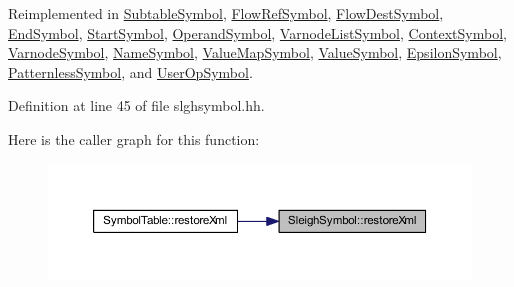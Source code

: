 Reimplemented in \mbox{\hyperlink{class_subtable_symbol_ac7ee481c0b61d730dab915a4f80e8061}{Subtable\+Symbol}}, \mbox{\hyperlink{class_flow_ref_symbol_a64565b89e176acc3743f31133548310d}{Flow\+Ref\+Symbol}}, \mbox{\hyperlink{class_flow_dest_symbol_a1ba9aafc51b34b72972f50748de739cc}{Flow\+Dest\+Symbol}}, \mbox{\hyperlink{class_end_symbol_a4b319014daff5bfe82e79d3b7e7b6402}{End\+Symbol}}, \mbox{\hyperlink{class_start_symbol_a8bffa932c38139afeacdafdbb8611c2f}{Start\+Symbol}}, \mbox{\hyperlink{class_operand_symbol_a89eb88d3d81b27fae7432adf31d2d27a}{Operand\+Symbol}}, \mbox{\hyperlink{class_varnode_list_symbol_a61923762838951414bd2c84454652d44}{Varnode\+List\+Symbol}}, \mbox{\hyperlink{class_context_symbol_a3ea7d156033d1dc82c9c3452496641a9}{Context\+Symbol}}, \mbox{\hyperlink{class_varnode_symbol_a9d0f7e98d0425e26ca4eddf002f1e471}{Varnode\+Symbol}}, \mbox{\hyperlink{class_name_symbol_a3ff5b56a8a5cfd2e009cc5c9e8a49e97}{Name\+Symbol}}, \mbox{\hyperlink{class_value_map_symbol_a713f4ece8b103374e08d4b53f9ef174b}{Value\+Map\+Symbol}}, \mbox{\hyperlink{class_value_symbol_af9104983ea7381b608fe56b5ab8a2d7c}{Value\+Symbol}}, \mbox{\hyperlink{class_epsilon_symbol_a0ce24cb1b91e38a1c45b5ec9d6af553a}{Epsilon\+Symbol}}, \mbox{\hyperlink{class_patternless_symbol_ab81f5522c0e65c2fe464d4bb62193948}{Patternless\+Symbol}}, and \mbox{\hyperlink{class_user_op_symbol_a96b0bf7c65b30f21307b156bf13bc1a7}{User\+Op\+Symbol}}.



Definition at line 45 of file slghsymbol.\+hh.

Here is the caller graph for this function\+:
\nopagebreak
\begin{figure}[H]
\begin{center}
\leavevmode
\includegraphics[width=350pt]{class_sleigh_symbol_accaec1696f99366fb0e089a7fceb56a3_icgraph}
\end{center}
\end{figure}
\mbox{\label{class_sleigh_symbol_addbcd83dac8157f1af67b21e560f4607}} 
